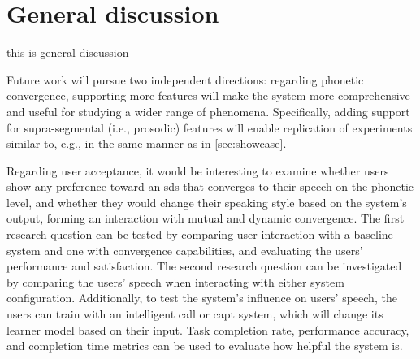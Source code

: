 \chapter*{General discussion}
\label{chap:general_discussion}


\acresetall

this is general discussion






\citet{Babel2012role} %


\citet{Levitan2016implementing} %


Future work will pursue two independent directions:
regarding phonetic convergence, supporting more features will make the system more comprehensive and useful for studying a wider range of phenomena.
Specifically, adding support for supra-segmental (i.e., prosodic) features will enable replication of experiments similar to, e.g., \citet{Levitan2014acoustic, Levitan2016implementing} in the same manner as in \cref{sec:showcase}.

Regarding user acceptance, it would be interesting to examine whether users show any preference toward an \ac{sds} that converges to their speech on the phonetic level, and whether they would change their speaking style based on the system's output, forming an interaction with mutual and dynamic convergence.
The first research question can be tested by comparing user interaction with a baseline system and one with convergence capabilities, and evaluating the users' performance and satisfaction.
The second research question can be investigated by comparing the users' speech when interacting with either system configuration.
Additionally, to test the system's influence on users' speech, the users can train with an intelligent \acf{call} or \acf{capt} system, which will change its learner model based on their input.
Task completion rate, performance accuracy, and completion time metrics can be used to evaluate how helpful the system is.

